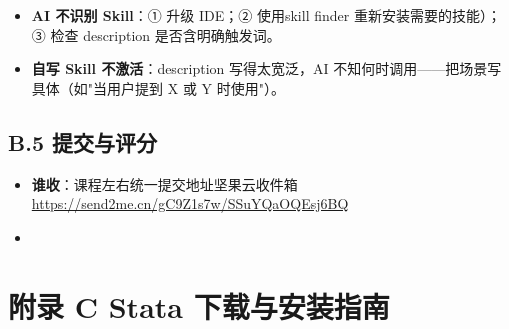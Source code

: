 \documentclass[
  american,
  chinese,
]{ctexart}
\providecommand{\tightlist}{%
  \setlength{\itemsep}{0pt}\setlength{\parskip}{0pt}}
\begin{document}
\begin{itemize}
\tightlist
\item
  \textbf{\foreignlanguage{american}{AI }}{\textbf{\foreignlanguage{american}{不识别}}}\textbf{\foreignlanguage{american}{ Skill}}\foreignlanguage{american}{：}\foreignlanguage{american}{① }{\foreignlanguage{american}{升级}}\foreignlanguage{american}{ IDE}\foreignlanguage{american}{；}\foreignlanguage{american}{② }{使用}\foreignlanguage{american}{skill finder }{重新安装需要的技能}\foreignlanguage{american}{）；}\foreignlanguage{american}{③
  }{\foreignlanguage{american}{检查}}\foreignlanguage{american}{ description }{\foreignlanguage{american}{是否含明确触发词}}\foreignlanguage{american}{。}
\item
  {\textbf{\foreignlanguage{american}{自写}}}\textbf{\foreignlanguage{american}{ Skill }}{\textbf{\foreignlanguage{american}{不激活}}\foreignlanguage{american}{：}\foreignlanguage{american}{description}}\foreignlanguage{american}{ }{\foreignlanguage{american}{写得太宽泛，}\foreignlanguage{american}{AI}}\foreignlanguage{american}{ }{\foreignlanguage{american}{不知何时调用}}\foreignlanguage{american}{------}{\foreignlanguage{american}{把场景写具体（如}\foreignlanguage{american}{"}\foreignlanguage{american}{当用户提到}}\foreignlanguage{american}{ X }\foreignlanguage{american}{或}\foreignlanguage{american}{ Y }{\foreignlanguage{american}{时使用}}\foreignlanguage{american}{"}\foreignlanguage{american}{）。}
\end{itemize}

\subsection{\texorpdfstring{\foreignlanguage{american}{B.5 }{\foreignlanguage{american}{提交与评分}}}{B.5 提交与评分}}\label{b.5-ux63d0ux4ea4ux4e0eux8bc4ux5206}

\begin{itemize}
\item
  \textbf{{谁收}}{：课程左右统一提交地址坚果云收件箱}{ }\foreignlanguage{american}{\href{https://send2me.cn/gC9Z1s7w/SSuYQaOQEsj6BQ}{{https://send2me.cn/gC9Z1s7w/SSuYQaOQEsj6BQ}}}\foreignlanguage{american}{}
\item
  \foreignlanguage{american}{}

  ~
\end{itemize}

\clearpage

\section{\texorpdfstring{{附录}\foreignlanguage{american}{ C Stata }{下载与安装指南}\foreignlanguage{american}{}}{附录 C Stata 下载与安装指南}}\label{ux9644ux5f55-c-stata-ux4e0bux8f7dux4e0eux5b89ux88c5ux6307ux5357}
\end{document}

